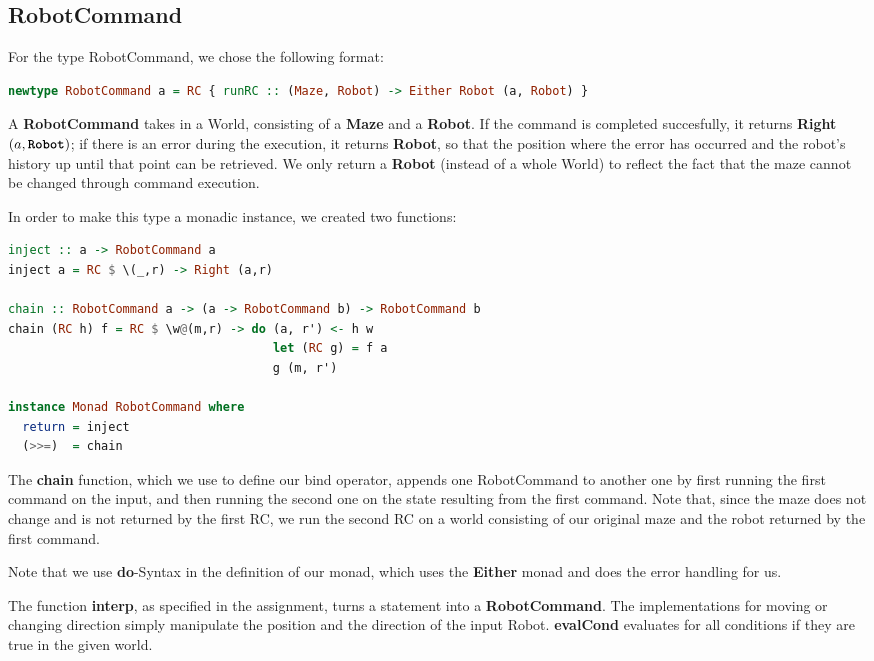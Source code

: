 \documentclass[a4paper]{article}
\newcommand{\func}[1]{\textbf{\ttfamily #1}\xspace}
\begin{document}
\subsection{\func{RobotCommand}}
For the type RobotCommand, we chose the following format:
\begin{lstlisting}[language=haskell]
newtype RobotCommand a = RC { runRC :: (Maze, Robot) -> Either Robot (a, Robot) }
\end{lstlisting}
A \func{RobotCommand} takes in a World, consisting of a \func{Maze} and a \func{Robot}. If the command is completed succesfully, it returns \func{Right} $(a, \text{\func{Robot}})$; if there is an error during the execution, it returns \func{Robot}, so that the position where the error has occurred and the robot's history up until that point can be retrieved. We only return a \func{Robot} (instead of a whole World) to reflect the fact that the maze cannot be changed through command execution.

In order to make this type a monadic instance, we created two functions:

\begin{lstlisting}[language=haskell]
inject :: a -> RobotCommand a
inject a = RC $ \(_,r) -> Right (a,r)
 
chain :: RobotCommand a -> (a -> RobotCommand b) -> RobotCommand b
chain (RC h) f = RC $ \w@(m,r) -> do (a, r') <- h w
                                     let (RC g) = f a
                                     g (m, r')
                                     
instance Monad RobotCommand where
  return = inject
  (>>=)  = chain
\end{lstlisting}

The \func{chain} function, which we use to define our bind operator, appends one RobotCommand to another one by first running the first command on the input, and then running the second one on the state resulting from the first command. Note that, since the maze does not change and is not returned by the first RC, we run the second RC on a world consisting of our original maze and the robot returned by the first command.

Note that we use \func{do}-Syntax in the definition of our monad, which uses the \func{Either} monad and does the error handling for us.

The function \func{interp}, as specified in the assignment, turns a statement into a \func{RobotCommand}. The implementations for moving or changing direction simply manipulate the position and the direction of the input Robot. \func{evalCond} evaluates for all conditions if they are true in the given world. 
\end{document}
